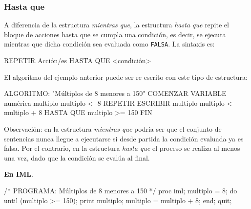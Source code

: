 \documentclass[
]{book}
\newenvironment{Shaded}{\begin{snugshade}}{\end{snugshade}}
\newcommand{\NormalTok}[1]{#1}
\begin{document}
\hypertarget{hasta-que}{%
\subsubsection{Hasta que}\label{hasta-que}}

A diferencia de la estructura \emph{mientras que}, la estructura \emph{hasta que} repite el bloque de acciones hasta que se cumpla una condición, es decir, se ejecuta mientras que dicha condición sea evaluada como \texttt{FALSA}. La sintaxis es:

\begin{Shaded}
\begin{Highlighting}[]
\NormalTok{REPETIR}
\NormalTok{    Acción/es}
\NormalTok{HASTA QUE \textless{}condición\textgreater{}}
\end{Highlighting}
\end{Shaded}

El algoritmo del ejemplo anterior puede ser re escrito con este tipo de estructura:

\begin{Shaded}
\begin{Highlighting}[]
\NormalTok{ALGORITMO: "Múltiplos de 8 menores a 150"}
\NormalTok{COMENZAR}
\NormalTok{    VARIABLE numérica multiplo}
\NormalTok{    multiplo \textless{}{-} 8}
\NormalTok{    REPETIR}
\NormalTok{        ESCRIBIR multiplo}
\NormalTok{        multiplo \textless{}{-} multiplo + 8}
\NormalTok{    HASTA QUE multiplo \textgreater{}= 150}
\NormalTok{FIN}
\end{Highlighting}
\end{Shaded}

Observación: en la estructura \emph{mientras que} podría ser que el conjunto de sentencias nunca llegue a ejecutarse si desde partida la condición evaluada ya es falsa. Por el contrario, en la estructura \emph{hasta que} el proceso se realiza al menos una vez, dado que la condición se evalúa al final.

\textbf{En IML}.

\begin{Shaded}
\begin{Highlighting}[]
\NormalTok{/* PROGRAMA: Múltiplos de 8 menores a 150 */}
\NormalTok{proc iml;}
\NormalTok{    multiplo = 8;}
\NormalTok{    do until (multiplo \textgreater{}= 150);}
\NormalTok{        print multiplo;}
\NormalTok{        multiplo = multiplo + 8;}
\NormalTok{    end;}
\NormalTok{quit;}
\end{Highlighting}
\end{Shaded}
\end{document}
